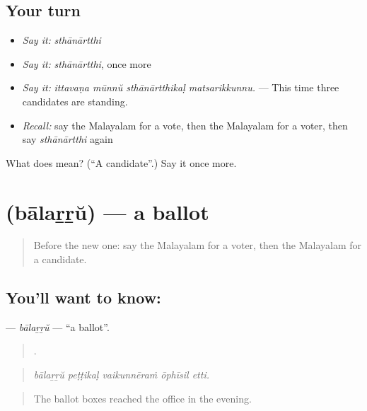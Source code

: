 \subsection*{Your turn}
\begin{itemize}
\raggedright
  \item \emph{Say it:} \emph{sthānārtthi}
  \item \emph{Say it:} \emph{sthānārtthi}, once more
  \item \emph{Say it:} \emph{ittavaṇa mūnnŭ sthānārtthikaḷ matsarikkunnu.} — This time three candidates are standing.
  \item \emph{Recall:} say the Malayalam for a vote, then the Malayalam for a voter, then say \emph{sthānārtthi} again
\end{itemize}

\begin{tcolorbox}[breakable,colback=teal!4,colframe=teal!35!black,title={Before you move on}]
What does  mean? (\textquotedblleft{}A candidate\textquotedblright{}.) Say it once more.
\end{tcolorbox}
\section[\texorpdfstring{\ml{ബാലറ്റ്} (bālaṟṟŭ)}{ബാലറ്റ് (bālaṟṟŭ)}]{ (bālaṟṟŭ) — a ballot}

\label{lesson:ML-C419-balarru}



\begin{quote}
Before the new one: say the Malayalam for a voter, then the Malayalam for a candidate.
\end{quote}

\subsection*{You'll want to know: }
\textbf{} — \emph{bālaṟṟŭ} — \textquotedblleft{}a ballot\textquotedblright{}.

\begin{quote}
    .
\end{quote}

\begin{quote}
\emph{bālaṟṟŭ peṭṭikaḷ vaikunnēraṁ ōphīsil etti.}
\end{quote}

\begin{quote}
The ballot boxes reached the office in the evening.
\end{quote}

